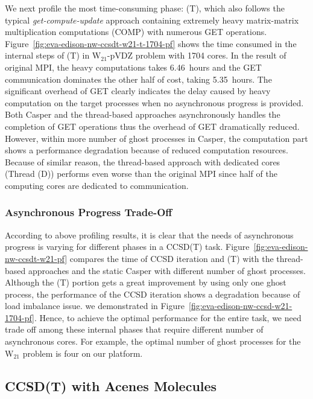 We next profile the most time-consuming phase: (T), which also follows the
typical {\em get-compute-update} approach containing extremely heavy
matrix-matrix multiplication computations (COMP) with numerous GET operations.
Figure~\ref{fig:eva-edison-nw-ccsdt-w21-t-1704-pf} shows the time consumed
in the internal steps of (T) in W$_{21}$-pVDZ problem with 1704 cores.
In the result of original MPI, the heavy computations takes 6.46~hours
and the GET communication dominates the other half of cost, taking
5.35~hours. The significant overhead of GET clearly indicates the delay
caused by heavy computation on the target processes when no asynchronous
progress is provided. Both Casper and the thread-based approaches asynchronously
handles the completion of GET operations thus the overhead of GET dramatically
reduced. However, within more number of ghost processes in Casper, the
computation part shows a performance degradation because of reduced
computation resources. Because of similar reason, the thread-based approach
with dedicated cores (Thread (D)) performs even worse than the original MPI
since half of the computing cores are dedicated to communication.


\subsubsection{Asynchronous Progress Trade-Off}

According to above profiling results, it is clear that the needs of
asynchronous progress is varying for different phases in a CCSD(T) task.
Figure~\ref{fig:eva-edison-nw-ccsdt-w21-pf} compares the time of CCSD
iteration and (T) with the thread-based approaches and the static Casper
with different number of ghost processes. Although the (T) portion gets
a great improvement by using only one ghost process, the performance of
the CCSD iteration shows a degradation because of load imbalance issue.
we demonstrated in Figure~\ref{fig:eva-edison-nw-ccsd-w21-1704-pf}. Hence,
to achieve the optimal performance for the entire task, we need trade off
among these internal phases that require different number of asynchronous
cores. For example, the optimal number of ghost processes for the W$_{21}$
problem is four on our platform.

\subsection{CCSD(T) with Acenes Molecules}

